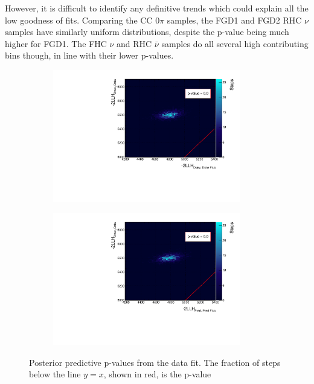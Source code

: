 However, it is difficult to identify any definitive trends which could explain all the low goodness of fits. Comparing the CC 0$\pi$ samples, the FGD1 and FGD2 RHC $\nu$ samples have similarly uniform distributions, despite the p-value being much higher for FGD1. The FHC $\nu$ and RHC $\bar{\nu}$ samples do all several high contributing bins though, in line with their lower p-values. 

\begin{figure}[!htbp]
\centering
\begin{subfigure}{.49\textwidth}
  \centering
	\includegraphics*[width=0.9\textwidth,clip]{figs/pval_}
\end{subfigure}
\begin{subfigure}{.49\textwidth}
  \centering
	\includegraphics*[width=0.9\textwidth,clip]{figs/pval2_}
\end{subfigure}
\caption{Posterior predictive p-values from the data fit. The fraction of steps below the line $y=x$, shown in red, is the p-value}\label{fig:pval}
\end{figure}


